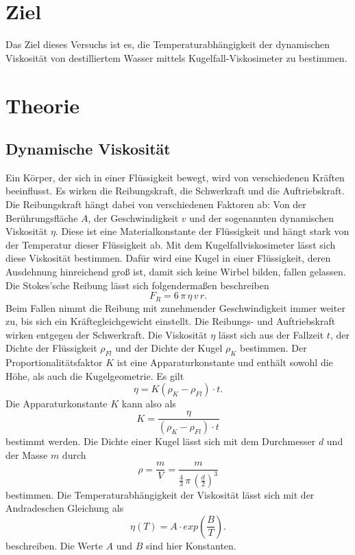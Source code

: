 \section{Ziel}
Das Ziel dieses Versuchs ist es, die Temperaturabhängigkeit
der dynamischen Viskosität von destilliertem Wasser mittels
Kugelfall-Viskosimeter zu bestimmen.

\section{Theorie}
\label{sec:Theorie}

\subsection{Dynamische Viskosität}
Ein Körper, der sich in einer Flüssigkeit bewegt, wird von verschiedenen Kräften beeinflusst. 
Es wirken die Reibungskraft, die Schwerkraft und die Auftriebskraft. 
Die Reibungskraft hängt dabei von verschiedenen Faktoren ab:
Von der Berührungsfläche $A$, der Geschwindigkeit $v$ und
der sogenannten dynamischen Viskosität $\eta$. 
Diese ist eine Materialkonstante der Flüssigkeit und hängt stark von der Temperatur dieser Flüssigkeit ab. 
\newline
Mit dem Kugelfallviskosimeter lässt sich diese Viskosität bestimmen. 
Dafür wird eine Kugel in einer Flüssigkeit, deren Ausdehnung hinreichend groß ist, 
damit sich keine Wirbel bilden, fallen gelassen. 
Die Stokes'sche Reibung lässt sich folgendermaßen beschreiben
\begin{equation*}
    F_R = 6 \, \pi \, \eta \, v \, r.
\end{equation*}
Beim Fallen nimmt die Reibung mit zunehmender Geschwindigkeit immer weiter zu, 
bis sich ein Kräftegleichgewicht einstellt. 
Die Reibungs- und Auftriebskraft wirken entgegen der Schwerkraft. 
Die Viskosität $\eta$ lässt sich aus der Fallzeit $t$, 
der Dichte der Flüssigkeit $\rho_{Fl}$ und der Dichte der Kugel $\rho_K$ bestimmen.
Der Proportionalitätsfaktor $K$ ist eine Apparaturkonstante und enthält sowohl die Höhe,
als auch die Kugelgeometrie.
Es gilt
\begin{equation}
    \eta = K (\rho_K -\rho_{Fl}) \cdot t.
    \label{eqn:eta}
\end{equation}
Die Apparaturkonstante $K$ kann also als 
\begin{equation}
    K = \frac{\eta}{(\rho_{K}-\rho_{Fl}) \cdot t}
    \label{eqn:K}
\end{equation}
bestimmt werden.
Die Dichte einer Kugel lässt sich mit dem Durchmesser $d$ und der Masse $m$ durch 
\begin{equation}
    \rho = \frac{m}{V} = \frac{m}{\frac{4}{3} \, \pi \, \left( \frac{d}{2} \right)^3}
    \label{eqn:dichte}
\end{equation}
bestimmen.
Die Temperaturabhängigkeit der Viskosität lässt sich mit der Andradeschen Gleichung 
als 
\begin{equation}
    \eta(T) = A\cdot exp \left( \frac{B}{T} \right). %
    \label{eqn:temp}
\end{equation}
beschreiben.
Die Werte $A$ und $B$ sind hier Konstanten.

